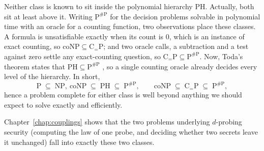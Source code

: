 Neither class is known to sit inside the polynomial hierarchy $\mathrm{PH}$. Actually, both
sit at least above it. Writing $\mathrm{P}^{\#\mathrm{P}}$ for the decision
problems solvable in polynomial time with an oracle for a counting function, two
observations place these classes. A formula is unsatisfiable exactly when its count is $0$,
which is an instance of exact counting, so $\mathrm{coNP} \subseteq
\mathrm{C}_{=}\mathrm{P}$; and two oracle calls, a subtraction and a test against
zero settle any exact-counting question, so $\mathrm{C}_{=}\mathrm{P} \subseteq
\mathrm{P}^{\#\mathrm{P}}$. Now, Toda's theorem states that $\mathrm{PH}
\subseteq \mathrm{P}^{\#\mathrm{P}}$ \parencite{toda1991pp}, so a single counting
oracle already decides every level of the hierarchy. In short,
\[
  \mathrm{P} \;\subseteq\; \mathrm{NP},\ \mathrm{coNP}
  \;\subseteq\; \mathrm{PH} \;\subseteq\; \mathrm{P}^{\#\mathrm{P}},
  \qquad
  \mathrm{coNP} \;\subseteq\; \mathrm{C}_{=}\mathrm{P}
  \;\subseteq\; \mathrm{P}^{\#\mathrm{P}} ,
\]
hence a problem complete for either class is well beyond anything we should expect to
solve exactly and efficiently.

Chapter~\ref{chap:couplings} shows that the two problems underlying $d$-probing
security (computing the law of one probe, and deciding whether two secrets
leave it unchanged) fall into exactly these two classes.
